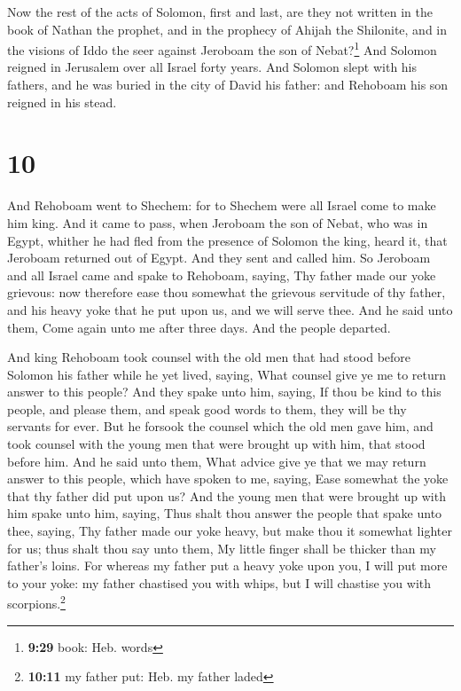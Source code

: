  Now the rest of the acts of Solomon, first and last, are
they not written in the book of Nathan the prophet, and in the prophecy
of Ahijah the Shilonite, and in the visions of Iddo the seer against
Jeroboam the son of Nebat?\footnote{\textbf{9:29} book: Heb. words}
 And Solomon reigned in Jerusalem over all Israel forty
years.  And Solomon slept with his fathers, and he was
buried in the city of David his father: and Rehoboam his son reigned in
his stead.

\hypertarget{section-9}{%
\section{10}\label{section-9}}

 And Rehoboam went to Shechem: for to Shechem were all
Israel come to make him king.  And it came to pass, when
Jeroboam the son of Nebat, who was in Egypt, whither he had fled from
the presence of Solomon the king, heard it, that Jeroboam returned out
of Egypt.  And they sent and called him. So Jeroboam and
all Israel came and spake to Rehoboam, saying,  Thy father
made our yoke grievous: now therefore ease thou somewhat the grievous
servitude of thy father, and his heavy yoke that he put upon us, and we
will serve thee.  And he said unto them, Come again unto
me after three days. And the people departed.

 And king Rehoboam took counsel with the old men that had
stood before Solomon his father while he yet lived, saying, What counsel
give ye me to return answer to this people?  And they
spake unto him, saying, If thou be kind to this people, and please them,
and speak good words to them, they will be thy servants for ever.
 But he forsook the counsel which the old men gave him,
and took counsel with the young men that were brought up with him, that
stood before him.  And he said unto them, What advice give
ye that we may return answer to this people, which have spoken to me,
saying, Ease somewhat the yoke that thy father did put upon us?
 And the young men that were brought up with him spake
unto him, saying, Thus shalt thou answer the people that spake unto
thee, saying, Thy father made our yoke heavy, but make thou it somewhat
lighter for us; thus shalt thou say unto them, My little finger shall be
thicker than my father's loins.  For whereas my father
put a heavy yoke upon you, I will put more to your yoke: my father
chastised you with whips, but I will chastise you with
scorpions.\footnote{\textbf{10:11} my father put: Heb. my father laded}

